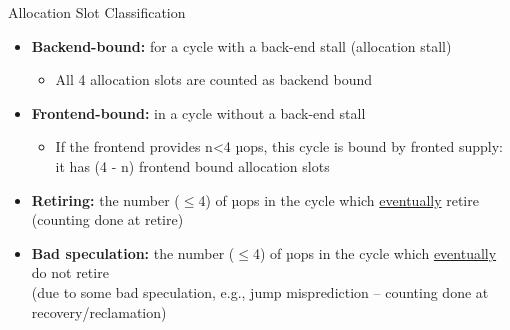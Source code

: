 \documentclass[aspectratio=169,10pt]{beamer}
\begin{document}
\begin{frame}{Allocation Slot Classification}
\begin{itemize}
  \item \textbf{Backend-bound:} for a cycle with a back-end stall (allocation stall)
  \begin{itemize}
    \item All 4 allocation slots are counted as backend bound
  \end{itemize}
  \item \textbf{Frontend-bound:} in a cycle without a back-end stall
  \begin{itemize}
    \item If the frontend provides n<4 µops, this cycle is bound by fronted supply:\\
    it has (4 - n) frontend bound allocation slots
  \end{itemize}
  \item \textbf{Retiring:} the number ($\leq$4) of µops in the cycle which \underline{eventually} retire (counting done at retire)
  \item \textbf{Bad speculation:} the number ($\leq$4) of µops in the cycle which \underline{eventually} do not retire\\
  (due to some bad speculation, e.g., jump misprediction – counting done at recovery/reclamation)
\end{itemize}

\vspace{0.3cm}
\begin{center}
\end{center}
\end{frame}
\end{document}
